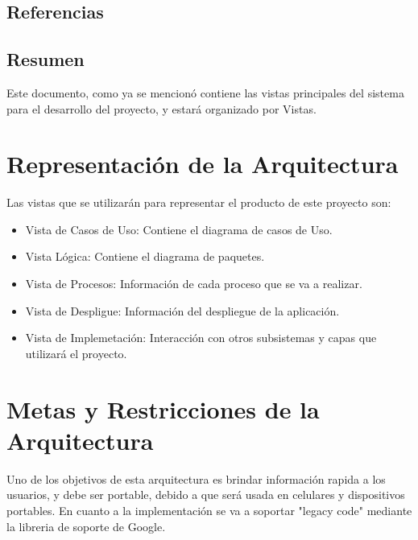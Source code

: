 \documentclass[12pt]{article}
\begin{document}
\subsection{Referencias}

\subsection{Resumen}
Este documento, como ya se mencion\'o contiene las vistas principales del sistema para el desarrollo del proyecto, y estar\'a organizado por Vistas.


\section{Representaci\'on de la Arquitectura}
Las vistas que se utilizar\'an para representar el producto de este proyecto son: 
\begin{itemize}
	\item{Vista de Casos de Uso: Contiene el diagrama de casos de Uso.}
	\item{Vista L\'ogica: Contiene el diagrama de paquetes.}
	\item{Vista de Procesos: Informaci\'on de cada proceso que se va a realizar.}
	\item{Vista de Despligue: Informaci\'on del despliegue de la aplicaci\'on.}
	\item{Vista de Implemetaci\'on: Interacci\'on con otros subsistemas y capas que utilizar\'a el proyecto.}
\end{itemize}

\section{Metas y Restricciones de la Arquitectura}
Uno de los objetivos de esta arquitectura es brindar informaci\'on rapida a los usuarios, y debe ser portable, debido a que ser\'a usada en celulares y dispositivos portables. En cuanto a la implementaci\'on se va a soportar "legacy code" mediante la libreria de soporte de Google.
\end{document}
